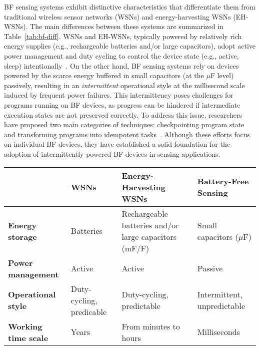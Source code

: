 \documentclass[lettersize,journal]{IEEEtran}
\begin{document}
BF sensing systems exhibit distinctive characteristics that differentiate them from traditional wireless sensor networks (WSNs) and energy-harvesting WSNs (EH-WSNs). The main differences between these systems are summarized in Table~\ref{tab:bf-diff}. WSNs and EH-WSNs, typically powered by relatively rich energy supplies (e.g., rechargeable batteries and/or large capacitors), adopt active power management and duty cycling to control the device state (e.g., active, sleep) intentionally~\cite{2014-mobihoc-eh,2016-infocom-panda,2018-infocom-ehwsn,2019-sigcomm-nd}. On the other hand, BF sensing systems rely on devices powered by the scarce energy buffered in small capacitors (at the $\mu$F level) passively, resulting in an \emph{intermittent} operational style at the millisecond scale induced by frequent power failures. This intermittency poses challenges for programs running on BF devices, as progress can be hindered if intermediate execution states are not preserved correctly. To address this issue, researchers have proposed two main categories of techniques: checkpointing program state~\cite{2020-asplos-tics, 2019-pldi-samoyed,2022-pldi-wario} and transforming programs into idempotent tasks~\cite{2020-asplos-chrt,2016-oopsla-chain,2018-sensys-ink,sensys-2017-task}. Although these efforts focus on individual BF devices, they have established a solid foundation for the adoption of intermittently-powered BF devices in sensing applications.

\begin{table*}[!t]
\small
    \caption{BF Sensing Systems vs. Traditional WSNs}\label{tab:bf-diff}
    \centering
    \begin{tabular}{llll}
        \toprule
         & \textbf{WSNs} & \textbf{Energy-Harvesting WSNs} & \textbf{Battery-Free Sensing} \\
        \midrule
        \rowcolor[gray]{0.95}\textbf{Energy storage} & Batteries & Rechargeable batteries and/or large capacitors (mF/F) & Small capacitors ($\mu$F) \\
        \textbf{Power management} & Active & Active & Passive \\
        \rowcolor[gray]{0.95}\textbf{Operational style} & Duty-cycling, predicable & Duty-cycling, predictable & Intermittent, unpredictable \\
        \textbf{Working time scale} & Years & From minutes to hours & Milliseconds \\
        \bottomrule
    \end{tabular}
\end{table*}
\end{document}
